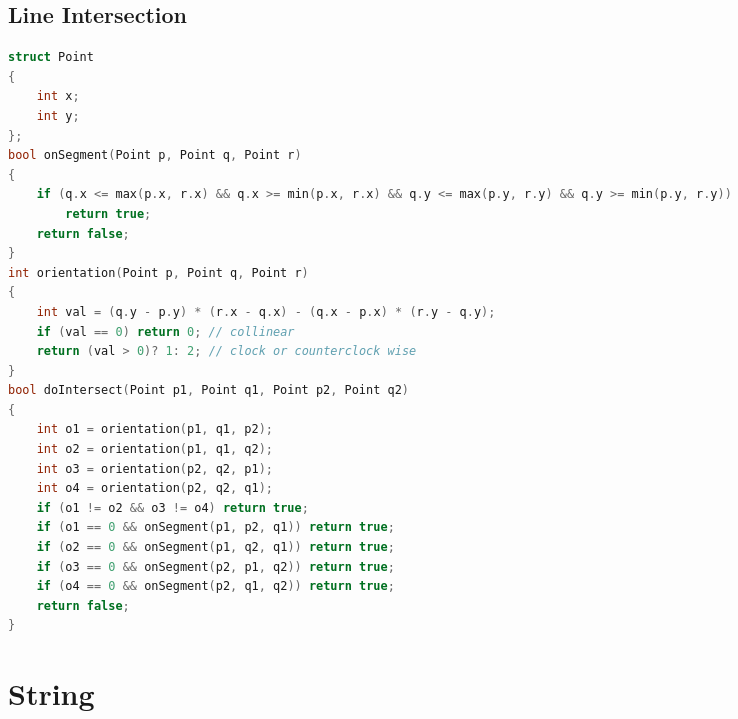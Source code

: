 \documentclass[10pt,a4paper,landscape]{article}
\begin{document}
\begin{multicols}{3}
\subsection{Line Intersection}
\begin{lstlisting}[language=C++, breaklines= true]
struct Point
{
    int x;
    int y;
};
bool onSegment(Point p, Point q, Point r)
{
    if (q.x <= max(p.x, r.x) && q.x >= min(p.x, r.x) && q.y <= max(p.y, r.y) && q.y >= min(p.y, r.y))
        return true;
    return false;
}
int orientation(Point p, Point q, Point r)
{
    int val = (q.y - p.y) * (r.x - q.x) - (q.x - p.x) * (r.y - q.y);
    if (val == 0) return 0; // collinear
    return (val > 0)? 1: 2; // clock or counterclock wise
}
bool doIntersect(Point p1, Point q1, Point p2, Point q2)
{
    int o1 = orientation(p1, q1, p2);
    int o2 = orientation(p1, q1, q2);
    int o3 = orientation(p2, q2, p1);
    int o4 = orientation(p2, q2, q1);
    if (o1 != o2 && o3 != o4) return true;
    if (o1 == 0 && onSegment(p1, p2, q1)) return true;
    if (o2 == 0 && onSegment(p1, q2, q1)) return true;
    if (o3 == 0 && onSegment(p2, p1, q2)) return true;
    if (o4 == 0 && onSegment(p2, q1, q2)) return true;
    return false;
}
\end{lstlisting}

\section{String}


\end{multicols}
\end{document}
